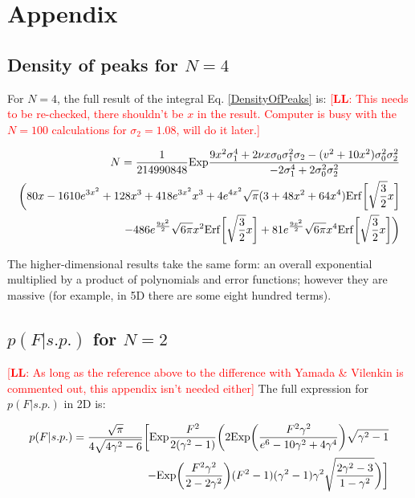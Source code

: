 \documentclass[12pt]{article}
\newcommand{\lfl}[1]{\textcolor{red}{[{\bf LL}: #1]}}
\begin{document}
\section{Appendix}
\subsection{Density of peaks for $N=4$} 
For $N=4$, the full result of the integral Eq. \ref{DensityOfPeaks} is: \lfl{This needs to be re-checked, there shouldn't be $x$ in the result. Computer is busy with the $N=100$ calculations for $\sigma_2=1.08$, will do it later.}

\begin{equation}
\begin{split}
N = \frac{1}{214990848} \mathrm{Exp}\frac{9x^2\sigma_1^4 + 2\nu x \sigma_0 \sigma_1^2 \sigma_2 - (v^2+10x^2)\sigma_0^2\sigma_2^2}{-2\sigma_1^4+2\sigma_0^2\sigma_2^2}\\\bigg{(}80x - 1610e^{3x^2}+128x^3+418e^{3x^2}x^3+4e^{4x^2}\sqrt{\pi}(3+48x^2+64x^4)\mathrm{Erf}\bigg{[}\sqrt{\frac{3}{2}}x\bigg{]}\\
-486e^{\frac{9x^2}{2}}\sqrt{6\pi}x^2\mathrm{Erf}\bigg{[}\sqrt{\frac{3}{2}}x\bigg{]}+81e^{\frac{9x^2}{2}}\sqrt{6\pi}x^4\mathrm{Erf}\bigg{[}\sqrt{\frac{3}{2}}x\bigg{]}\bigg{)}
\end{split}
\end{equation}

The higher-dimensional results take the same form: an overall exponential multiplied by a product of polynomials and error functions; however they are massive (for example, in 5D there are some eight hundred terms).

\subsection{$p(F|s.p.)$ for $N=2$}
\lfl{As long as the reference above to the difference with Yamada \& Vilenkin is commented out, this appendix isn't needed either}
The full expression for $p(F|s.p.)$ in 2D is:

\begin{equation}
\begin{split}
p(F|s.p.)=\frac{\sqrt{\pi}}{4\sqrt{4\gamma^2-6}}\bigg{[}\mathrm{Exp}\frac{F^2}{2(\gamma^2-1)}\bigg{(}2\mathrm{Exp}\bigg{(}\frac{F^2\gamma^2}{e^6-10\gamma^2+4\gamma^4}\bigg{)}\sqrt{\gamma^2-1}\\
-\mathrm{Exp}\bigg{(}\frac{F^2\gamma^2}{2-2\gamma^2}\bigg{)}(F^2-1)(\gamma^2-1)\gamma^2\sqrt{\frac{2\gamma^2-3}{1-\gamma^2}}\bigg{)}\bigg{]}
\end{split}
\end{equation}
\end{document}
